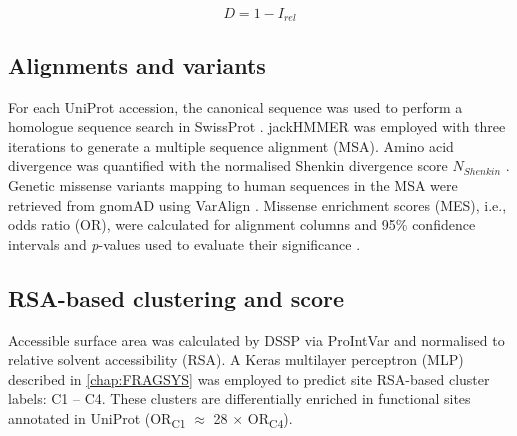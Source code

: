 \vspace{-12pt} %
\vspace{-12pt} %

\begin{equation}
D = 1 - I_{rel}
\label{eq:Irel_distance}
\end{equation}

\vspace{-12pt} %
\vspace{-12pt} %
\vspace{-12pt} %
\vspace{-12pt} %

\subsection{Alignments and variants}

For each UniProt accession, the canonical sequence was used to perform a homologue sequence search in SwissProt \cite{BOUTET_2016_UNIPROT}. jackHMMER \cite{EDDY_1995_HMMER} was employed with three iterations to generate a multiple sequence alignment (MSA). Amino acid divergence was quantified with the normalised Shenkin divergence score \cite{SHENKIN_1991_SCORE} $N_{Shenkin}$ \cite{UTGES_2021_ANKS}. Genetic missense variants mapping to human sequences in the MSA were retrieved from gnomAD \cite{KARCZEWSKI_2020_GNOMAD} using VarAlign \cite{MACGOWAN_2017_VARIANTS}. Missense enrichment scores (MES), i.e., odds ratio (OR), were calculated for alignment columns \cite{MACGOWAN_2024_VARIANTS} and 95\% confidence intervals and \textit{p}-values used to evaluate their significance \cite{SZUMILAS_2010_ODDSRATIOS}.

\subsection{RSA-based clustering and score}

Accessible surface area was calculated by DSSP \cite{KABSCH_1983_DSSP} via ProIntVar \cite{MACGOWAN_2020_DRSASP} and normalised \cite{TIEN_2013_RSA} to relative solvent accessibility (RSA). A Keras \cite{CHOLLET_2015_KERAS} multilayer perceptron (MLP) \cite{CYBENKO_1989_MLP} described in \autoref{chap:FRAGSYS} \cite{UTGES_2024_FRAGSYS} was employed to predict site RSA-based cluster labels: C1 – C4. These clusters are differentially enriched in functional sites annotated in UniProt \cite{NIGHTINGALE_2017_API} (OR\textsubscript{C1} $\approx$ 28 $\times$ OR\textsubscript{C4}).

